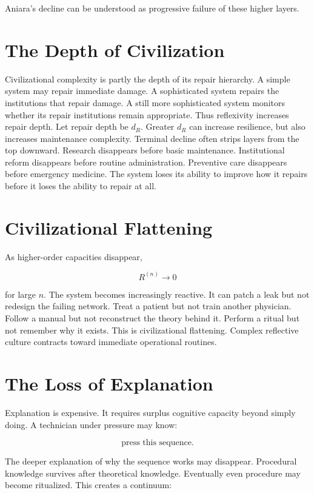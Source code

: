 \documentclass[11pt,oneside]{book}
\theoremstyle{definition}
\theoremstyle{remark}
\begin{document}
Aniara's decline can be understood as progressive failure of these higher layers.

\section{The Depth of Civilization}

Civilizational complexity is partly the depth of its repair hierarchy. A simple system may repair
immediate damage. A sophisticated system repairs the institutions that repair damage. A still more
sophisticated system monitors whether its repair institutions remain appropriate. Thus reflexivity
increases repair depth. Let repair depth be \(d_R\). Greater \(d_R\) can increase resilience, but
also increases maintenance complexity. Terminal decline often strips layers from the top downward.
Research disappears before basic maintenance. Institutional reform disappears before routine
administration. Preventive care disappears before emergency medicine. The system loses its ability
to improve how it repairs before it loses the ability to repair at all.

\section{Civilizational Flattening}

As higher-order capacities disappear,

\[
R^{(n)} \rightarrow0
\]

for large \(n\). The system becomes increasingly reactive. It can patch a leak but not redesign the
failing network. Treat a patient but not train another physician. Follow a manual but not
reconstruct the theory behind it. Perform a ritual but not remember why it exists. This is
civilizational flattening. Complex reflective culture contracts toward immediate operational
routines.

\section{The Loss of Explanation}

Explanation is expensive. It requires surplus cognitive capacity beyond simply doing. A technician
under pressure may know:

\[
\text{press this sequence}.
\]

The deeper explanation of why the sequence works may disappear. Procedural knowledge survives after
theoretical knowledge. Eventually even procedure may become ritualized. This creates a continuum:
\end{document}
